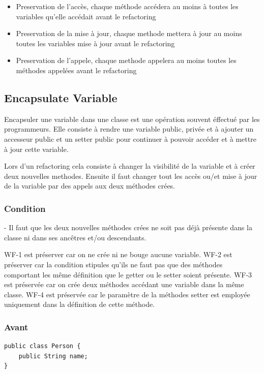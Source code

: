 \documentclass[a4paper, 12pt]{article}
\begin{document}
\begin{itemize}
\item Preservation de l'accès, chaque méthode accédera au moins à toutes les variables qu'elle accédait avant le refactoring
\item Preservation de la mise à jour, chaque methode mettera à jour au moins toutes les variables mise à jour avant le refactoring
\item Preservation de l'appele, chaque methode appelera au moins toutes les méthodes appelées avant le refactoring
\end{itemize}

\subsection{Encapsulate Variable}

Encapsuler une variable dans une classe est une opération souvent éffectué par les programmeurs. 
Elle consiste à rendre une variable public, privée et à ajouter un accesseur public et un setter public pour continuer à pouvoir accéder et à mettre à jour cette variable.

Lors d'un refactoring cela consiste à changer la visibilité de la variable et à créer deux nouvelles methodes. Ensuite il faut changer tout les accès ou/et mise à jour de la variable par des appels aux deux méthodes crées.

\subsubsection{Condition}

- Il faut que les deux nouvelles méthodes crées ne soit pas déjà présente dans la classe ni dans ses ancêtres et/ou descendants.

WF-1 est préserver car on ne crée ni ne bouge aucune variable.
WF-2 est préserver car la condition stipules qu'ils ne faut pas que des méthodes comportant les même définition que le getter ou le setter soient présente.
WF-3 est préservée car on crée deux méthodes accédant une variable dans la même classe.
WF-4 est préservée car le paramètre de la méthodes setter est employée uniquement dans la définition de cette méthode.

\subsubsection{Avant}

\begin{lstlisting}[frame=single]
public class Person {
	public String name;
}
\end{lstlisting}
\end{document}
